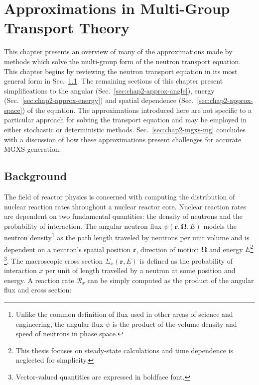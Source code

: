 \chapter{Approximations in Multi-Group Transport Theory}
\label{chap:mgxs}

This chapter presents an overview of many of the approximations made by methods which solve the multi-group form of the neutron transport equation. This chapter begins by reviewing the neutron transport equation in its most general form in Sec.~\ref{sec:chap2-background}. The remaining sections of this chapter present simplifications to the angular (Sec.~\ref{sec:chap2-approx-angle}), energy (Sec.~\ref{sec:chap2-approx-energy}) and spatial dependence (Sec.~\ref{sec:chap2-approx-space}) of the equation. The approximations introduced here are not specific to a particular approach for solving the transport equation and may be employed in either stochastic or deterministic methods. Sec.~\ref{sec:chap2-mgxs-mg} concludes with a discussion of how these approximations present challenges for accurate \ac{MGXS} generation.


\section{Background}
\label{sec:chap2-background}

The field of reactor physics is concerned with computing the distribution of nuclear reaction rates throughout a nuclear reactor core. Nuclear reaction rates are dependent on two fundamental quantities: the density of neutrons and the probability of interaction. The angular neutron flux $\psi(\mathbf{r},\mathbf{\Omega},E)$ models the neutron density\footnote{Unlike the common definition of flux used in other areas of science and engineering, the angular flux $\psi$ is the product of the volume density and speed of neutrons in phase space.} as the path length traveled by neutrons per unit volume and is dependent on a neutron's spatial position $\mathbf{r}$, direction of motion $\mathbf{\Omega}$ and energy $E$\footnote{This thesis focuses on steady-state calculations and time dependence is neglected for simplicity.}$^{,}$\footnote{Vector-valued quantities are expressed in boldface font.}. The macroscopic cross section $\Sigma_{x}(\mathbf{r},E)$ is defined as the probability of interaction $x$ per unit of length travelled by a neutron at some position and energy. A reaction rate $\mathcal{R}_{x}$ can be simply computed as the product of the angular flux and cross section:

